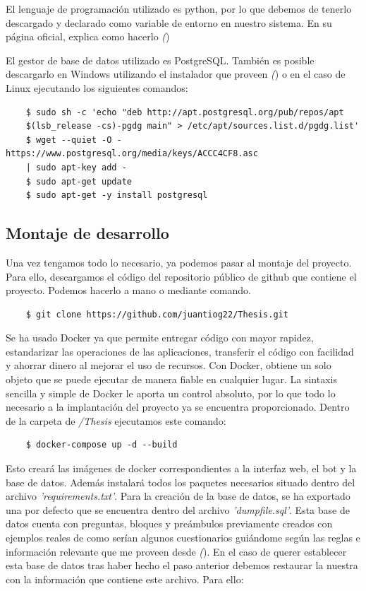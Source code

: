 El lenguaje de programación utilizado es python, por lo que debemos de tenerlo descargado y declarado como variable de entorno en nuestro sistema. En su página oficial, explica como hacerlo \textit({\cite{python})}

El gestor de base de datos utilizado es PostgreSQL. También es posible descargarlo en Windows utilizando el instalador que proveen \textit({\cite{postgres})} o en el caso de Linux ejecutando los siguientes comandos:

\begin{verbatim}
    $ sudo sh -c 'echo "deb http://apt.postgresql.org/pub/repos/apt
    $(lsb_release -cs)-pgdg main" > /etc/apt/sources.list.d/pgdg.list'
    $ wget --quiet -O - https://www.postgresql.org/media/keys/ACCC4CF8.asc 
    | sudo apt-key add -
    $ sudo apt-get update
    $ sudo apt-get -y install postgresql
\end{verbatim}


\subsection{Montaje de desarrollo}

Una vez tengamos todo lo necesario, ya podemos pasar al montaje del proyecto. Para ello, descargamos el código del repositorio público de github que contiene el proyecto. Podemos hacerlo a mano o mediante comando.

\begin{verbatim}
    $ git clone https://github.com/juantiog22/Thesis.git
\end{verbatim}

Se ha usado Docker ya que permite entregar código con mayor rapidez, estandarizar las operaciones de las aplicaciones, transferir el código con facilidad y ahorrar dinero al mejorar el uso de recursos. Con Docker, obtiene un solo objeto que se puede ejecutar de manera fiable en cualquier lugar. La sintaxis sencilla y simple de Docker le aporta un control absoluto, por lo que todo lo necesario a la implantación del proyecto ya se encuentra proporcionado. Dentro de la carpeta de \textit{/Thesis} ejecutamos este comando:

\begin{verbatim}
    $ docker-compose up -d --build  
\end{verbatim}

Esto creará las imágenes de docker correspondientes a la interfaz web, el bot y la base de datos. Además instalará todos los paquetes necesarios situado dentro del archivo \textit{'requirements.txt'}. 
Para la creación de la base de datos, se ha exportado una por defecto que se encuentra dentro del archivo \textit{'dumpfile.sql'}. Esta base de datos cuenta con preguntas, bloques y preámbulos previamente creados con ejemplos reales de como serían algunos cuestionarios guiándome según las reglas e información relevante que me proveen desde \textit({\cite{postcovid})}. En el caso de querer establecer esta base de datos tras haber hecho el paso anterior debemos restaurar la nuestra con la información que contiene este archivo. Para ello:


